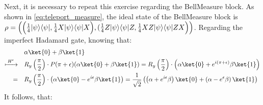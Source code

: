 Next, it is necessary to repeat this exercise regarding the BellMeasure block. As shown in \autoref{eq:teleport_measure}, the ideal state of the BellMeasure block is $\\ \rho = \Big(\Big(\frac{1}{4} |\psi\rangle \langle \psi|, \frac{1}{4} X|\psi\rangle \langle \psi|X\Big),(\frac{1}{4} Z|\psi\rangle \langle \psi|Z, \frac{1}{4}  XZ|\psi\rangle \langle \psi|ZX \Big)\Big)$. Regarding the imperfect Hadamard gate, knowing that:
\begin{equation}
  \begin{split}
    &\alpha \ket{0} + \beta \ket{1} \\
    \xmapsto{ \hspace{2pt} H^{\epsilon} \hspace{2pt}} \quad & R_{y}\left(\frac{\pi}{2}\right)\cdot P(\pi + \epsilon) (\alpha \ket{0} + \beta \ket{1}) = R_{y}\left(\frac{\pi}{2}\right)\cdot \left( \alpha \ket{0} + e^{i(\pi+\epsilon)}\beta \ket{1} \right) \\
    = \quad & R_{y}\left(\frac{\pi}{2}\right)\cdot \left( \alpha \ket{0} - e^{i\epsilon}\beta \ket{1} \right) = \frac{1}{\sqrt{2}} \left(\left( \alpha + e^{i\epsilon} \beta\right) \ket{0} + \left( \alpha - e^{\epsilon} \beta\right)  \ket{1} \right)\\
  \end{split}
\end{equation}
It follows, that:
